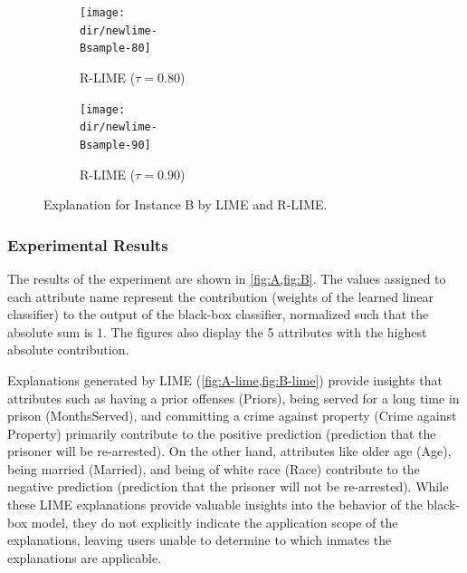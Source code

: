 \documentclass[11pt]{article}
\begin{document}
{{\begin{figure}[p]
\begin{subfigure}[t]{\imgwidth}
        \end{subfigure}
        \begin{subfigure}[t]{\imgwidth}
          \hspace{-0.8em}
          \texttt{[image: \\dir/newlime-\\Bsample-80]}
          \caption{R-LIME ($\tau=0.80$)}\label{fig:B-rlime-80}
        \end{subfigure}
        \begin{subfigure}[t]{\imgwidth}
          \hspace{-0.8em}
          \texttt{[image: \\dir/newlime-\\Bsample-90]}
          \caption{R-LIME ($\tau=0.90$)}\label{fig:B-rlime-90}
        \end{subfigure}
        \caption[Explanation for Instance B by LIME and R-LIME]{%
          Explanation for Instance B by LIME and R-LIME.
        }\label{fig:B}
      \end{figure}
    }
  }
\subsubsection{Experimental Results}
The results of the experiment are shown in \cref{fig:A,fig:B}.
The values assigned to each attribute name represent the contribution
(weights of the learned linear classifier)
to the output of the black-box classifier,
normalized such that the absolute sum is 1.
The figures also display the 5 attributes with the highest absolute contribution.

Explanations generated by LIME (\cref{fig:A-lime,fig:B-lime}) provide insights
that attributes such as having a prior offenses (Priors),
being served for a long time in prison (MonthsServed),
and committing a crime against property (Crime against Property)
primarily contribute to the positive prediction
(prediction that the prisoner will be re-arrested).
On the other hand,
attributes like older age (Age), being married (Married),
and being of white race (Race) contribute to the negative prediction
(prediction that the prisoner will not be re-arrested).
While these LIME explanations provide valuable insights into the behavior of
the black-box model,
they do not explicitly indicate the application scope of the explanations,
leaving users unable to determine to which inmates the explanations are applicable.
\end{document}
